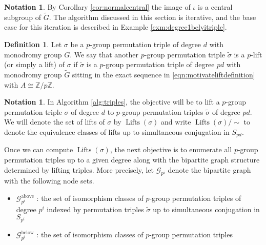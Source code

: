 \documentclass{dcthesis}
\newcommand{\ZZ}{\mathbb Z}
\newcommand{\defi}[1]{\textsf{#1}}
\newcommand{\mm}[1]{{\color{blue} \sf MM: [#1]}}
\newcommand{\wt}[1]{\widetilde{#1}}
\DeclareMathOperator{\Lifts}{Lifts}
\numberwithin{equation}{section}
\theoremstyle{definition}
\newtheorem{definition}[equation]{Definition}
\newtheorem{notation}[equation]{Notation}
\theoremstyle{remark}
\begin{document}
{{{\begin{notation}
      By Corollary \ref{cor:normalcentral}
      the image of $\iota$
      is a central subgroup of $\wt{G}$.
      The algorithm discussed in this section
      is iterative,
      and the base case for this
      iteration is described in
      Example \ref{exm:degree1belyitriple}.
    \end{notation}
    \begin{definition}
      \label{def:lift}
      Let $\sigma$ be a $p$-group permutation
      triple of degree $d$
      with monodromy group $G$.
      We say that another
      $p$-group permutation
      triple $\wt{\sigma}$
      is a \defi{$p$-lift}
      (or simply a \defi{lift})
      of $\sigma$
      if $\wt{\sigma}$ is
      a $p$-group permutation triple of degree $pd$
      with monodromy group $\wt{G}$
      sitting in the exact sequence
      in
      \eqref{eqn:motivateliftdefinition}
      with $A\cong\ZZ/p\ZZ$.
    \end{definition}
    \begin{notation}
      \label{not:bipartitegraphs}
      In Algorithm \ref{alg:triples},
      the objective will be to lift a
      $p$-group permutation triple
      $\sigma$
      of degree $d$
      to $p$-group permutation
      triples $\wt{\sigma}$
      of degree $pd$.
      We will denote the set
      of lifts of $\sigma$
      by $\Lifts(\sigma)$
      and write $\Lifts(\sigma)/\!\!\sim$
      to denote the equivalence classes
      of lifts up to simultaneous conjugation
      in $S_{pd}$.
      \par
      Once we can compute
      $\Lifts(\sigma)$,
      the next objective is
      to enumerate all $p$-group permutation
      triples up to a given degree
      along with the bipartite graph
      structure determined by lifting triples.
      More precisely,
      let
      $\mathscr{G}_{p^i}$ denote the bipartite
      graph with the following node sets.
      \begin{itemize}
        \item
          $\mathscr{G}_{p^i}^\text{above}$ :
          the set of isomorphism classes
          of $p$-group permutation triples
          of degree $p^i$ indexed by
          permutation triples $\wt{\sigma}$
          up to simultaneous conjugation
          in $S_{p^i}$
        \item
          $\mathscr{G}_{p^i}^\text{below}$ :
          the set of isomorphism classes
          of $p$-group permutation triples

\end{itemize}
\end{notation}}}}
\end{document}
